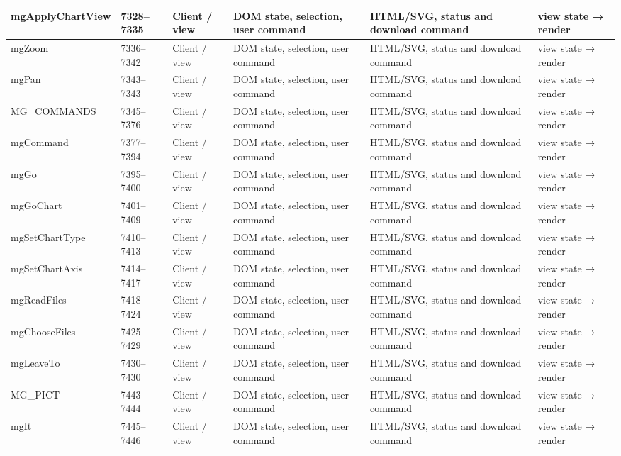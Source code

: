 \begin{landscape}
\begin{longtable}{@{}p{3.2cm}p{1.45cm}p{2.7cm}p{4.0cm}p{4.0cm}p{3.0cm}@{}}
mgApplyChartView & 7328--7335 & Client / view & DOM state, selection, user command & HTML/SVG, status and download command & view state → render \\\hline
mgZoom & 7336--7342 & Client / view & DOM state, selection, user command & HTML/SVG, status and download command & view state → render \\\hline
mgPan & 7343--7343 & Client / view & DOM state, selection, user command & HTML/SVG, status and download command & view state → render \\\hline
MG\_COMMANDS & 7345--7376 & Client / view & DOM state, selection, user command & HTML/SVG, status and download command & view state → render \\\hline
mgCommand & 7377--7394 & Client / view & DOM state, selection, user command & HTML/SVG, status and download command & view state → render \\\hline
mgGo & 7395--7400 & Client / view & DOM state, selection, user command & HTML/SVG, status and download command & view state → render \\\hline
mgGoChart & 7401--7409 & Client / view & DOM state, selection, user command & HTML/SVG, status and download command & view state → render \\\hline
mgSetChartType & 7410--7413 & Client / view & DOM state, selection, user command & HTML/SVG, status and download command & view state → render \\\hline
mgSetChartAxis & 7414--7417 & Client / view & DOM state, selection, user command & HTML/SVG, status and download command & view state → render \\\hline
mgReadFiles & 7418--7424 & Client / view & DOM state, selection, user command & HTML/SVG, status and download command & view state → render \\\hline
mgChooseFiles & 7425--7429 & Client / view & DOM state, selection, user command & HTML/SVG, status and download command & view state → render \\\hline
mgLeaveTo & 7430--7430 & Client / view & DOM state, selection, user command & HTML/SVG, status and download command & view state → render \\\hline
MG\_PICT & 7443--7444 & Client / view & DOM state, selection, user command & HTML/SVG, status and download command & view state → render \\\hline
mgIt & 7445--7446 & Client / view & DOM state, selection, user command & HTML/SVG, status and download command & view state → render \\\hline

\end{longtable}
\end{landscape}
